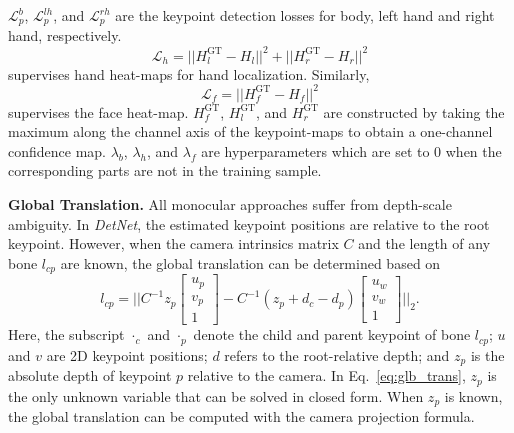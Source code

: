 \documentclass[final]{cvpr}
\begin{document}
$\mathcal{L}_{p}^{b}$, $\mathcal{L}_{p}^{lh}$, and $\mathcal{L}_{p}^{rh}$ are the keypoint detection losses for body, left hand and right hand, respectively.
\begin{equation}
  \mathcal{L}_h = || H^{\mathrm{GT}}_{l} - H_l ||^2 + || H^{\mathrm{GT}}_{r} - H_r ||^2
\end{equation}
supervises hand heat-maps for hand localization.
Similarly,
\begin{equation}
  \mathcal{L}_f = || H^{\mathrm{GT}}_{f} - H_f ||^2
\end{equation}
supervises the face heat-map.
$H_f^{\mathrm{GT}}$, $H_{l}^{\mathrm{GT}}$, and $H_{r}^{\mathrm{GT}}$ are constructed by taking the maximum along the channel axis of the keypoint-maps to obtain a one-channel confidence map.
$\lambda_b$, $\lambda_h$, and $\lambda_f$ are hyperparameters which are set to 0 when the corresponding parts are not in the training sample.
\par
\noindent \textbf{Global Translation.}
All monocular approaches suffer from depth-scale ambiguity.
In \textit{DetNet}, the estimated keypoint positions are relative to the root keypoint.
However, when the camera intrinsics matrix $C$ and the length of any bone $l_{cp}$ are known, the global translation can be determined based on
\begin{equation}
  l_{cp} = || C^{-1} z_p\begin{bmatrix} u_p \\ v_p \\ 1 \end{bmatrix} -
  C^{-1} (z_p + d_c - d_p) \begin{bmatrix} u_w \\ v_w \\ 1 \end{bmatrix} ||_2 \mathrm{.}
  \label{eq:glb_trans}
\end{equation}
Here, the subscript $\cdot_c$ and $\cdot_p$ denote the child and parent keypoint of bone $l_{cp}$;
$u$ and $v$ are 2D keypoint positions;
$d$ refers to the root-relative depth;
and $z_p$ is the absolute depth of keypoint $p$ relative to the camera.
In Eq.~\ref{eq:glb_trans}, $z_p$ is the only unknown variable that can be solved in closed form.
When $z_p$ is known, the global translation can be computed with the camera projection formula.
\end{document}
